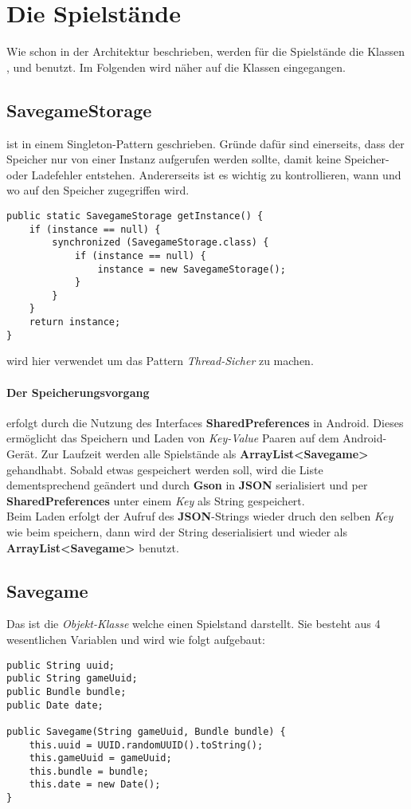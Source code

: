 \section{Die Spielstände}
\sectionauthor{\leonard}

Wie schon in der Architektur beschrieben, werden für die Spielstände die Klassen 
,  und  benutzt.
Im Folgenden wird näher auf die Klassen eingegangen.

\subsection{SavegameStorage}
ist in einem Singleton-Pattern geschrieben. Gründe dafür sind einerseits, dass 
der Speicher nur von einer Instanz aufgerufen werden sollte, damit keine 
Speicher- oder Ladefehler entstehen. Andererseits ist es wichtig zu kontrollieren, 
wann und wo auf den Speicher zugegriffen wird. 
\begin{lstlisting}[caption={SavegameStorage Singleton},captionpos=b]
public static SavegameStorage getInstance() {
	if (instance == null) {
		synchronized (SavegameStorage.class) {
			if (instance == null) {
				instance = new SavegameStorage();
			}
		}
	}
	return instance;
}
\end{lstlisting}
 wird hier verwendet um das Pattern \emph{Thread-Sicher} zu 
machen.

\paragraph{Der Speicherungsvorgang}
erfolgt durch die Nutzung des Interfaces \textbf{SharedPreferences} in Android.
Dieses ermöglicht das Speichern und Laden von \emph{Key-Value} Paaren auf dem
Android-Gerät. Zur Laufzeit werden alle Spielstände als
\textbf{ArrayList<Savegame>} gehandhabt.  Sobald etwas
gespeichert werden soll, wird die Liste dementsprechend geändert und durch
\textbf{Gson} in \textbf{JSON} serialisiert und per \textbf{SharedPreferences}
unter einem \emph{Key} als String gespeichert.\\
Beim Laden erfolgt der Aufruf des \textbf{JSON}-Strings wieder druch den selben
\emph{Key} wie beim speichern, dann wird der String deserialisiert und wieder
als \textbf{ArrayList<Savegame>} benutzt.

\subsection{Savegame}
Das ist die \emph{Objekt-Klasse} welche einen Spielstand darstellt. Sie besteht 
aus 4 wesentlichen Variablen und wird wie folgt aufgebaut:
\begin{lstlisting}[caption={Savegame Variablen \& Konstruktor},captionpos=b]
public String uuid;
public String gameUuid;
public Bundle bundle;
public Date date;

public Savegame(String gameUuid, Bundle bundle) {
	this.uuid = UUID.randomUUID().toString();
	this.gameUuid = gameUuid;
	this.bundle = bundle;
	this.date = new Date();
}
\end{lstlisting}

